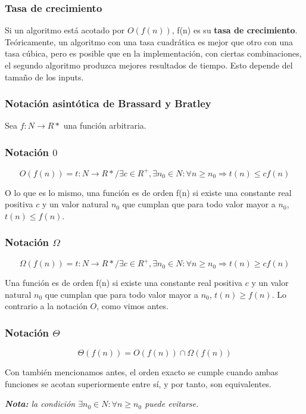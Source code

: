 \documentclass[11pt,a4paper]{article}
\begin{document}
\subsubsection*{Tasa de crecimiento}

Si un algoritmo está acotado por $O(f(n))$, f(n) es su \textbf{tasa de crecimiento}. Teóricamente, un algoritmo con una tasa cuadrática es mejor que otro con una tasa cúbica, pero es posible que en la implementación, con ciertas combinaciones, el segundo algoritmo produzca mejores resultados de tiempo. Esto depende del tamaño de los inputs. 

\subsubsection{Notación asintótica de Brassard y Bratley}

Sea $f:N \rightarrow R*$ una función arbitraria.

\subsubsection*{Notación $0$}

$$O(f(n)) = {t:N \rightarrow R* / \exists c \in R^{+}, \exists n_{0} \in N : \forall n \geq  n_{0} \Rightarrow t(n) \leq cf(n)}$$

O lo que es lo mismo, una función es de orden f(n) si existe una constante real positiva $c$ y un valor natural $n_{0}$ que cumplan que para todo valor mayor a $n_{0}$, $t(n) \leq f(n)$.


\subsubsection*{Notación $\Omega$}

$$\Omega(f(n)) = {t:N \rightarrow R* / \exists c \in R^{+}, \exists n_{0} \in N : \forall n \geq  n_{0} \Rightarrow t(n) \geq cf(n)}$$

Una función es de orden f(n) si existe una constante real positiva $c$ y un valor natural $n_{0}$ que cumplan que para todo valor mayor a $n_{0}$, $t(n) \geq f(n)$. Lo contrario a la notación $O$, como vimos antes.

\subsubsection*{Notación $\Theta$}

$$\Theta(f(n)) = O(f(n)) \cap \Omega(f(n))$$

Con también mencionamos antes, el orden exacto se cumple cuando ambas funciones se acotan superiormente entre sí, y por tanto, son equivalentes.

\bigskip

\textit{\textbf{Nota:} la condición $\exists n_{0} \in N : \forall n \geq n_{0}$ puede evitarse.}
\end{document}
